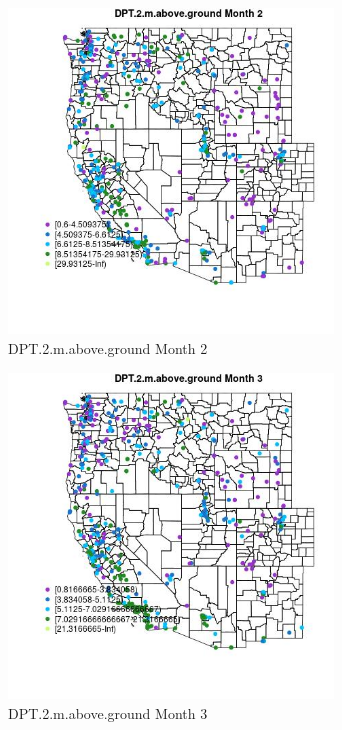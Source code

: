 \begin{figure} 
\centering  
\includegraphics[width=0.77\textwidth]{Code_Outputs/ML_input_report_ML_input_PM25_Step5_part_d_de_duplicated_aves_ML_input_MapObsMo2DPT2maboveground.jpg} 
\caption{\label{fig:ML_input_report_ML_input_PM25_Step5_part_d_de_duplicated_aves_ML_inputMapObsMo2DPT2maboveground}DPT.2.m.above.ground Month 2} 
\end{figure} 
 

\begin{figure} 
\centering  
\includegraphics[width=0.77\textwidth]{Code_Outputs/ML_input_report_ML_input_PM25_Step5_part_d_de_duplicated_aves_ML_input_MapObsMo3DPT2maboveground.jpg} 
\caption{\label{fig:ML_input_report_ML_input_PM25_Step5_part_d_de_duplicated_aves_ML_inputMapObsMo3DPT2maboveground}DPT.2.m.above.ground Month 3} 
\end{figure} 
 

